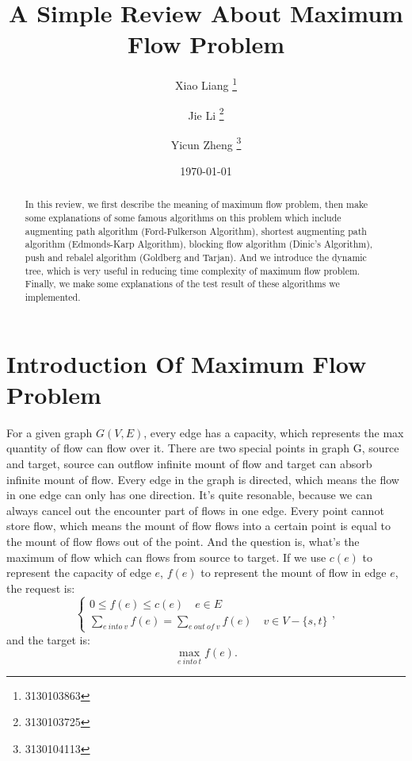 \documentclass[twocolumn,9pt]{extarticle}
\begin{document}
\title{\textbf{A Simple Review About Maximum Flow Problem}}
\author{Xiao Liang \thanks{3130103863} \and Jie Li \thanks{3130103725} \and Yicun Zheng \thanks{3130104113}}
\date{\today}
\maketitle

\begin{abstract}
In this review, we first describe the meaning of maximum flow problem, then make some explanations of some famous algorithms on this problem which include augmenting path algorithm (Ford-Fulkerson Algorithm), shortest augmenting path algorithm (Edmonds-Karp Algorithm), blocking flow algorithm (Dinic's Algorithm), push and rebalel algorithm (Goldberg and Tarjan). And we introduce the dynamic tree, which is very useful in reducing time complexity of maximum flow problem. Finally, we make some explanations of the test result of these algorithms we implemented.
\end{abstract}


\section{Introduction Of Maximum Flow Problem}
For a given graph $G(V,E)$, every edge has a capacity, which represents the max quantity of flow can flow over it. There are two special points in graph G, source and target, source can outflow infinite mount of flow and target can absorb infinite mount of flow. Every edge in the graph is directed, which means the flow in one edge can only has one direction. It's quite resonable, because we can always cancel out the encounter part of flows in one edge. Every point cannot store flow, which means the mount of flow flows into a certain point is equal to the mount of flow flows out of the point. And the question is, what's the maximum of flow which can flows from source to target.
If we use $c(e)$ to represent the capacity of edge $e$, $f(e)$ to represent the mount of flow in edge $e$, the request is:
\begin{equation}
	\begin{cases}
		0 \leq f(e) \leq c(e) \quad e \in E \\
		\sum_{e\ into\ v}{f(e)} = \sum_{e\ out\ of\ v}{f(e)} \quad v \in V-\{s,t\}
	\end{cases},
\end{equation}
and the target is:
\begin{equation}
\max_{e\ into\ t}{f(e)}.
\end{equation}
\end{document}
